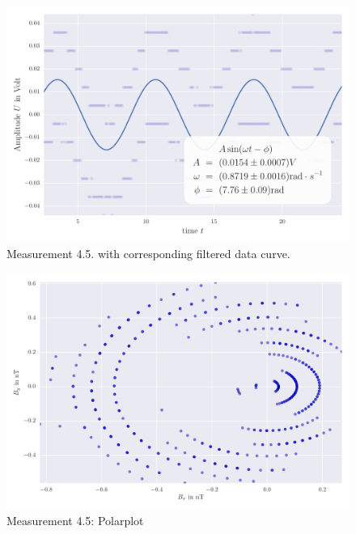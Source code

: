 \begin{figure}[H]
    \centering
    \includegraphics[width=0.7\linewidth]{analysis/figures/fit4_5}
    \caption{Measurement 4.5. with corresponding filtered data curve.}
    \label{fig:4_5_plot}
\end{figure}
\begin{figure}[H]
    \centering
    \includegraphics[width=0.7\linewidth]{analysis/figures/polar4_5}
    \caption{Measurement 4.5: Polarplot}
    \label{fig:4_5_polar}
\end{figure}



